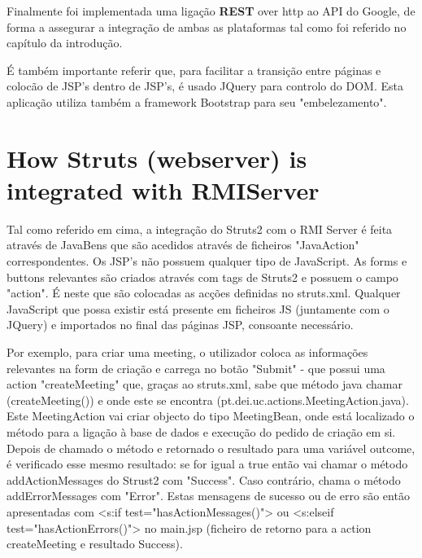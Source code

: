 \documentclass[12pt]{article} %
\begin{document}
Finalmente foi implementada uma ligação \textbf{REST} over http ao API do Google, de forma a assegurar a integração de ambas as plataformas tal como foi referido no capítulo da introdução.

É também importante referir que, para facilitar a transição entre páginas e colocão de JSP's dentro de JSP's, é usado JQuery para controlo do DOM. Esta aplicação utiliza também a framework Bootstrap para seu "embelezamento".
 
\pagebreak
\section{How Struts (webserver) is integrated with RMIServer} %
\label{sec:struts2_rmiserver}

Tal como referido em cima, a integração do Struts2 com o RMI Server é feita através de JavaBens que são acedidos através de ficheiros "JavaAction" correspondentes. Os JSP's não possuem qualquer tipo de JavaScript. As forms e buttons relevantes são criados através com tags de Struts2 e possuem o campo "action". É neste que são colocadas as acções definidas no struts.xml. Qualquer JavaScript que possa existir está presente em ficheiros JS (juntamente com o JQuery) e importados no final das páginas JSP, consoante necessário. 

Por exemplo, para criar uma meeting, o utilizador coloca as informações relevantes na form de criação e carrega no botão "Submit" - que possui uma action "createMeeting" que, graças ao struts.xml, sabe que método java chamar (createMeeting()) e onde este se encontra (pt.dei.uc.actions.MeetingAction.java). Este MeetingAction vai criar objecto do tipo MeetingBean, onde está localizado o método para a ligação à base de dados e execução do pedido de criação em si. Depois de chamado o método e retornado o resultado para uma variável outcome, é verificado esse mesmo resultado: se for igual a true então vai chamar o método addActionMessages do Strust2 com "Success". Caso contrário, chama o método addErrorMessages com "Error". Estas mensagens de sucesso ou de erro são então apresentadas com <s:if test="hasActionMessages()"> ou <s:elseif test="hasActionErrors()"> no main.jsp (ficheiro de retorno para a action createMeeting e resultado Success).


\pagebreak
\end{document}
